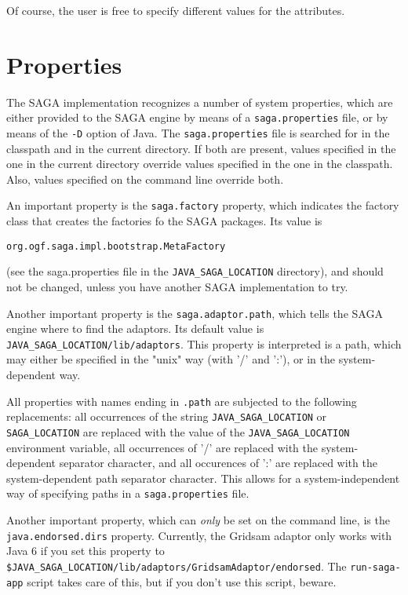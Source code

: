 \documentclass[a4paper,10pt]{article}
\begin{document}
Of course, the user is free to specify different values for the attributes.

\section{Properties}

The SAGA implementation recognizes a number of system properties, which
are either provided to the SAGA engine by means of a \texttt{saga.properties}
file, or by means of the \texttt{-D} option of Java.
The \texttt{saga.properties} file is searched for in the classpath and in
the current directory. If both are present, values specified in the one
in the current directory override values specified in the one in the
classpath. Also, values specified on the command line override both.

An important property is the \texttt{saga.factory} property, which
indicates the factory class that creates the factories fo the SAGA
packages.
Its value is
\noindent
{\small
\begin{verbatim}
org.ogf.saga.impl.bootstrap.MetaFactory
\end{verbatim}
}
\noindent
(see the saga.properties file in the
\texttt{JAVA\_SAGA\_LOCATION} directory), and
should not be changed, unless you have another SAGA implementation to try.

Another important property is the \texttt{saga.adaptor.path},
which tells the SAGA engine where to find the adaptors.
Its default value is \texttt{JAVA\_SAGA\_LOCATION/lib/adaptors}.
This property is interpreted is a path, which may either be specified in the
"unix" way (with '/' and ':'), or in the system-dependent way.

All properties with names ending in \texttt{.path} are subjected to
the following replacements: all occurrences of the string
\texttt{JAVA\_SAGA\_LOCATION} or \texttt{SAGA\_LOCATION} are replaced with the value of the
\texttt{JAVA\_SAGA\_LOCATION} environment variable, all occurrences
of '/' are replaced with the system-dependent separator character,
and all occurences of ':' are replaced with the system-dependent
path separator character. This allows for a system-independent way
of specifying paths in a \texttt{saga.properties} file.

Another important property, which can \emph{only} be set on the
command line, is the \texttt{java.endorsed.dirs} property. Currently,
the Gridsam adaptor only works with Java 6 if you set this property
to \texttt{\$JAVA\_SAGA\_LOCATION/lib/adaptors/GridsamAdaptor/endorsed}.
The \texttt{run-saga-app} script takes care of this, but if you don't
use this script, beware.
\end{document}
